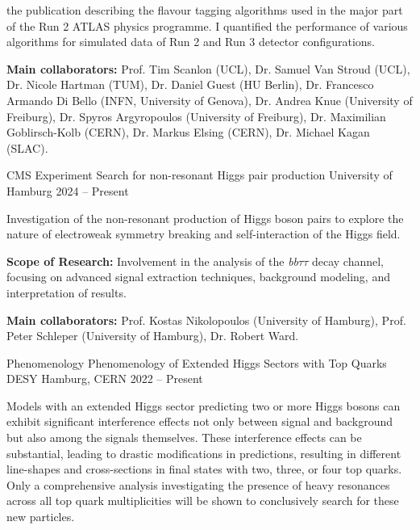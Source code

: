 \begin{cventries}
{\begin{cvitems}
    the publication describing the flavour tagging algorithms used in the major part of the Run 2
    ATLAS physics programme. I quantified the performance of various algorithms for simulated
    data of Run 2 and Run 3 detector configurations.
    \item \textbf{Main collaborators:} Prof. Tim Scanlon (UCL), Dr. Samuel Van Stroud (UCL), Dr. Nicole
    Hartman (TUM), Dr. Daniel Guest (HU Berlin), Dr. Francesco Armando Di Bello (INFN,
    University of Genova), Dr. Andrea Knue (University of Freiburg), Dr. Spyros Argyropoulos (University of Freiburg), Dr. Maximilian Goblirsch-Kolb (CERN), Dr. Markus Elsing (CERN),
    Dr. Michael Kagan (SLAC).
  \end{cvitems}
}
\cventry
  {CMS Experiment} %
  {Search for non-resonant Higgs pair production} %
  {University of Hamburg} %
  {2024 -- Present} %
{
  \begin{cvitems} %
    \item {Investigation of the non-resonant production of Higgs boson pairs to explore the nature of electroweak symmetry breaking and self-interaction of the Higgs field.}
    \item \textbf{Scope of Research:} Involvement in the analysis of the \textit{bb}\ensuremath{\tau}\ensuremath{\tau} decay channel, focusing on advanced signal extraction techniques, background modeling, and interpretation of results.   
    \item \textbf{Main collaborators:} Prof. Kostas Nikolopoulos (University of Hamburg), Prof. Peter Schleper (University of Hamburg), Dr. Robert Ward.
  \end{cvitems}
}
\cventry
{Phenomenology} %
{Phenomenology of Extended Higgs Sectors with Top Quarks} %
{DESY Hamburg, CERN} %
{2022 -- Present} %
{
  \begin{cvitems} %
    \item {Models with an extended Higgs sector predicting two or more Higgs bosons can exhibit significant interference effects not only between signal and background but also among the signals themselves.
    These interference effects can be substantial, leading to drastic modifications in predictions,
    resulting in different line-shapes and cross-sections in final states with two, three, or four top quarks. Only a comprehensive analysis investigating the presence of heavy resonances across all top quark multiplicities will be shown to conclusively search for these new particles.}

\end{cvitems}}
\end{cventries}
